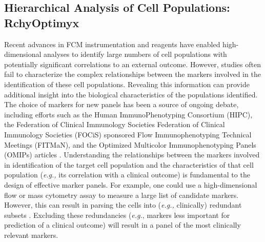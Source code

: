 \subsection{Hierarchical Analysis of Cell Populations: RchyOptimyx}
\label{sec:fcs:rchy}
Recent advances in FCM instrumentation and reagents  have enabled high-dimensional analyses to identify large numbers of  cell populations with potentially significant correlations to an external outcome.
However,  studies often fail to characterize the complex relationships between the markers involved in the  identification of these cell populations.
Revealing this information can provide additional insight into the biological characteristics of the populations identified.
The choice of markers for new panels has been a source of ongoing debate, including efforts such as the Human ImmunoPhenotyping Consortium (HIPC), the Federation of Clinical Immunology Societies Federation of Clinical Immunology Societies (FOCiS) sponsored Flow Immunophenotyping Technical Meetings (FITMaN), and the Optimized Multicolor Immunophenotyping Panels (OMIPs) articles \cite{Maecker2012Standardizing,roederer2010omips,mahnke2010omip,chattopadhyay2010omip,wei2011omip,biancotto2011omip,foulds2012omip,murdoch2012omip,eller2012omip,zuleger2012omip,lamoreaux2012omip,preijers2012omip}.
Understanding the relationships between the markers involved in identification of the target cell population and the characteristics of that cell population (\emph{e.g.,} its correlation with a clinical outcome) is fundamental to the design of effective marker panels. 
For example, one could use a high-dimensional flow or mass cytometry assay to measure a large list of candidate markers.
However, this can result in parsing the cells into (\emph{e.g.,} clinically) redundant subsets \cite{bendall2012deep}.
Excluding these redundancies (\emph{e.g.}, markers less important for prediction of a clinical outcome) will result in a panel of the most clinically relevant markers.


